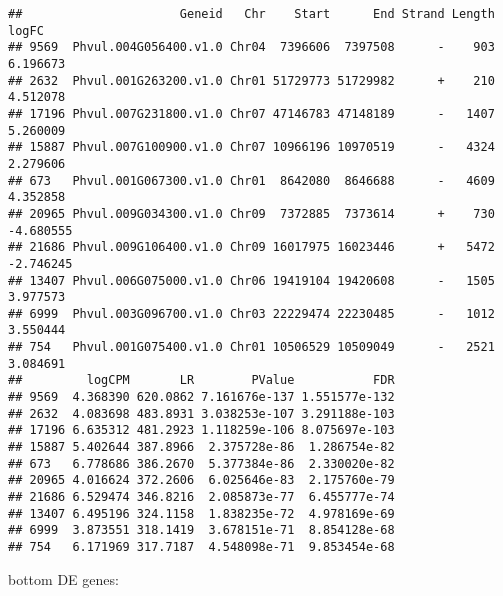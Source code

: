\documentclass[
]{article}
\newenvironment{Shaded}{\begin{snugshade}}{\end{snugshade}}
\newcommand{\DecValTok}[1]{\textcolor[rgb]{0.00,0.00,0.81}{#1}}
\newcommand{\FloatTok}[1]{\textcolor[rgb]{0.00,0.00,0.81}{#1}}
\newcommand{\KeywordTok}[1]{\textcolor[rgb]{0.13,0.29,0.53}{\textbf{#1}}}
\newcommand{\NormalTok}[1]{#1}
\newcommand{\OperatorTok}[1]{\textcolor[rgb]{0.81,0.36,0.00}{\textbf{#1}}}
\newcommand{\StringTok}[1]{\textcolor[rgb]{0.31,0.60,0.02}{#1}}
\begin{document}
\begin{Shaded}
\end{Shaded}

\begin{verbatim}
##                      Geneid   Chr    Start      End Strand Length     logFC
## 9569  Phvul.004G056400.v1.0 Chr04  7396606  7397508      -    903  6.196673
## 2632  Phvul.001G263200.v1.0 Chr01 51729773 51729982      +    210  4.512078
## 17196 Phvul.007G231800.v1.0 Chr07 47146783 47148189      -   1407  5.260009
## 15887 Phvul.007G100900.v1.0 Chr07 10966196 10970519      -   4324  2.279606
## 673   Phvul.001G067300.v1.0 Chr01  8642080  8646688      -   4609  4.352858
## 20965 Phvul.009G034300.v1.0 Chr09  7372885  7373614      +    730 -4.680555
## 21686 Phvul.009G106400.v1.0 Chr09 16017975 16023446      +   5472 -2.746245
## 13407 Phvul.006G075000.v1.0 Chr06 19419104 19420608      -   1505  3.977573
## 6999  Phvul.003G096700.v1.0 Chr03 22229474 22230485      -   1012  3.550444
## 754   Phvul.001G075400.v1.0 Chr01 10506529 10509049      -   2521  3.084691
##         logCPM       LR        PValue           FDR
## 9569  4.368390 620.0862 7.161676e-137 1.551577e-132
## 2632  4.083698 483.8931 3.038253e-107 3.291188e-103
## 17196 6.635312 481.2923 1.118259e-106 8.075697e-103
## 15887 5.402644 387.8966  2.375728e-86  1.286754e-82
## 673   6.778686 386.2670  5.377384e-86  2.330020e-82
## 20965 4.016624 372.2606  6.025646e-83  2.175760e-79
## 21686 6.529474 346.8216  2.085873e-77  6.455777e-74
## 13407 6.495196 324.1158  1.838235e-72  4.978169e-69
## 6999  3.873551 318.1419  3.678151e-71  8.854128e-68
## 754   6.171969 317.7187  4.548098e-71  9.853454e-68
\end{verbatim}

bottom DE genes:

\begin{Shaded}
\end{Shaded}
\end{document}
